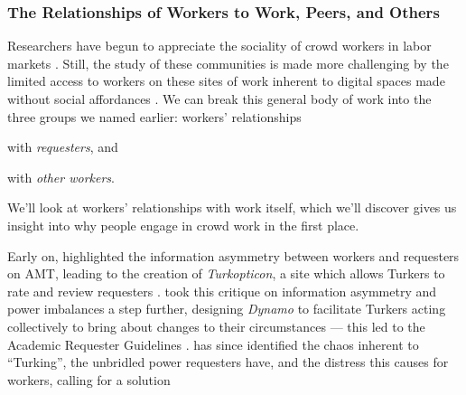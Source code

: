 \documentclass[trackingWork]{subfiles}
\begin{document}
\subsubsection[What will work and the place of work look like for workers]{The Relationships of Workers to Work, Peers, and Others}
\label{sec:relationships}

\subsubsubsection{\crowdworkpers}
Researchers have begun to appreciate
the sociality of crowd workers in labor markets
\cite{crowdcollab}.
Still, the study of these communities is made more challenging by
the limited access to workers on these sites of work
inherent to digital spaces made without social affordances
\cite{miller2011understanding}.
We can break this general body of work into the three groups we named earlier:
workers' relationships
\begin{inlinelist}
\item with \textit{requesters}, and
\item with \textit{other workers}.
\end{inlinelist}
We'll look at workers' relationships with work itself, which we'll discover
gives us insight into why people engage in crowd work in the first place.

Early on, \citeauthor{turkopticon} highlighted
the information asymmetry between workers and requesters on AMT,
leading to the creation of \textit{Turkopticon}, a site which allows
Turkers to rate and review requesters
\cite{turkopticon}.
\citeauthor{dynamo} took this critique on information asymmetry and power imbalances a step further,
designing \textit{Dynamo} to facilitate
Turkers acting collectively to bring about changes to their circumstances
--- this led to the Academic Requester Guidelines
\cite{dynamo}.
\citeauthor{fixingChaos} has since identified the chaos inherent to ``Turking'',
the unbridled power requesters have, and
the distress this causes for workers,
calling for a solution
\end{document}
